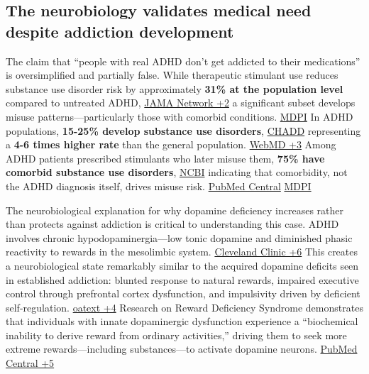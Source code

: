 \subsection{The neurobiology validates medical need despite addiction development}\label{10c_self_medication-the-neurobiology-validates-medical-need-despite-addiction-development}

The claim that ``people with real ADHD don't get addicted to their medications'' is oversimplified and partially false. While therapeutic stimulant use reduces substance use disorder risk by approximately \textbf{31\% at the population level} compared to untreated ADHD, \href{https://jamanetwork.com/journals/jamapsychiatry/fullarticle/2806881}{JAMA Network +2} a significant subset develops misuse patterns---particularly those with comorbid conditions. \href{https://www.mdpi.com/2077-0383/12/9/3096}{MDPI} In ADHD populations, \textbf{15-25\% develop substance use disorders}, \href{https://chadd.org/attention-article/when-adhd-and-substance-use-disorders-coexist/}{CHADD} representing a \textbf{4-6 times higher rate} than the general population. \href{https://www.webmd.com/add-adhd/adhd-and-substance-abuse-is-there-a-link}{WebMD +3} Among ADHD patients prescribed stimulants who later misuse them, \textbf{75\% have comorbid substance use disorders}, \href{https://www.ncbi.nlm.nih.gov/pmc/articles/PMC3277944/}{NCBI} indicating that comorbidity, not the ADHD diagnosis itself, drives misuse risk. \href{https://pmc.ncbi.nlm.nih.gov/articles/PMC2676785/}{PubMed Central} \href{https://www.mdpi.com/2077-0383/12/9/3096}{MDPI}

The neurobiological explanation for why dopamine deficiency increases rather than protects against addiction is critical to understanding this case. ADHD involves chronic hypodopaminergia---low tonic dopamine and diminished phasic reactivity to rewards in the mesolimbic system. \href{https://my.clevelandclinic.org/health/symptoms/23224-executive-dysfunction}{Cleveland Clinic +6} This creates a neurobiological state remarkably similar to the acquired dopamine deficits seen in established addiction: blunted response to natural rewards, impaired executive control through prefrontal cortex dysfunction, and impulsivity driven by deficient self-regulation. \href{https://www.oatext.com/The-overlapping-neurobiology-of-addiction-and-ADHD.php}{oatext +4} Research on Reward Deficiency Syndrome demonstrates that individuals with innate dopaminergic dysfunction experience a ``biochemical inability to derive reward from ordinary activities,'' driving them to seek more extreme rewards---including substances---to activate dopamine neurons. \href{https://pmc.ncbi.nlm.nih.gov/articles/PMC7236426/}{PubMed Central +5}

